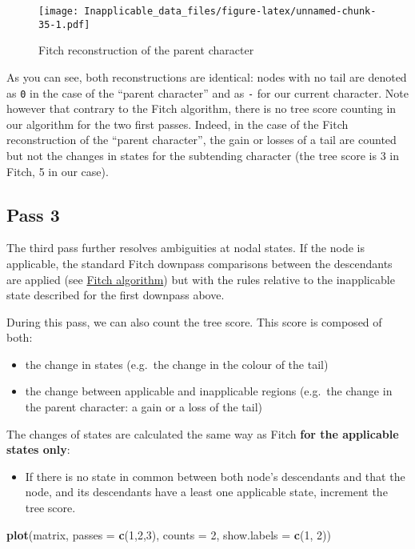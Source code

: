 \documentclass[]{book}
\newenvironment{Shaded}{\begin{snugshade}}{\end{snugshade}}
\newcommand{\KeywordTok}[1]{\textcolor[rgb]{0.13,0.29,0.53}{\textbf{#1}}}
\newcommand{\DataTypeTok}[1]{\textcolor[rgb]{0.13,0.29,0.53}{#1}}
\newcommand{\DecValTok}[1]{\textcolor[rgb]{0.00,0.00,0.81}{#1}}
\newcommand{\NormalTok}[1]{#1}
\providecommand{\tightlist}{%
  \setlength{\itemsep}{0pt}\setlength{\parskip}{0pt}}
\theoremstyle{definition}
\theoremstyle{definition}
\theoremstyle{definition}
\theoremstyle{remark}
\begin{document}
\begin{figure}
\centering
\texttt{[image: Inapplicable\_data\_files/figure-latex/unnamed-chunk-35-1.pdf]}
\caption{\label{fig:unnamed-chunk-35}Fitch reconstruction of the parent
character}
\end{figure}

As you can see, both reconstructions are identical: nodes with no tail
are denoted as \texttt{0} in the case of the ``parent character'' and as
\texttt{-} for our current character. Note however that contrary to the
Fitch algorithm, there is no tree score counting in our algorithm for
the two first passes. Indeed, in the case of the Fitch reconstruction of
the ``parent character'', the gain or losses of a tail are counted but
not the changes in states for the subtending character (the tree score
is 3 in Fitch, 5 in our case).

\hypertarget{pass-3}{%
\subsection{Pass 3}\label{pass-3}}

The third pass further resolves ambiguities at nodal states. If the node
is applicable, the standard Fitch downpass comparisons between the
descendants are applied (see \protect\hyperlink{fitch}{Fitch algorithm})
but with the rules relative to the inapplicable state described for the
first downpass above.

During this pass, we can also count the tree score. This score is
composed of both:

\begin{itemize}
\tightlist
\item
  the change in states (e.g.~the change in the colour of the tail)
\item
  the change between applicable and inapplicable regions (e.g.~the
  change in the parent character: a gain or a loss of the tail)
\end{itemize}

The changes of states are calculated the same way as Fitch \textbf{for
the applicable states only}:

\begin{itemize}
\tightlist
\item
  If there is no state in common between both node's descendants and
  that the node, and its descendants have a least one applicable state,
  increment the tree score.
\end{itemize}

\begin{Shaded}
\begin{Highlighting}[]
\KeywordTok{plot}\NormalTok{(matrix, }\DataTypeTok{passes =} \KeywordTok{c}\NormalTok{(}\DecValTok{1}\NormalTok{,}\DecValTok{2}\NormalTok{,}\DecValTok{3}\NormalTok{), }\DataTypeTok{counts =} \DecValTok{2}\NormalTok{, }\DataTypeTok{show.labels =} \KeywordTok{c}\NormalTok{(}\DecValTok{1}\NormalTok{, }\DecValTok{2}\NormalTok{))}
\end{Highlighting}
\end{Shaded}
\end{document}
